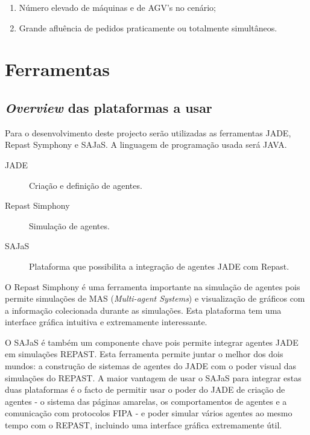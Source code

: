 \begin{titlepage}
\begin{enumerate}
\item Número elevado de máquinas e de AGV's no cenário;
\item Grande afluência de pedidos praticamente ou totalmente simultâneos.
\end{enumerate}



\section{Ferramentas}

\subsection{\textit{Overview} das plataformas a usar}
Para o desenvolvimento deste projecto serão utilizadas as ferramentas JADE, Repast Symphony e SAJaS. A linguagem de programação usada será JAVA.

\begin{description}
\item[JADE] Criação e definição de agentes.
\item[Repast Simphony] Simulação de agentes.
\item[SAJaS] Plataforma que possibilita a integração de agentes JADE com Repast.
\end{description}

O Repast Simphony é uma ferramenta importante na simulação de agentes pois permite simulações de MAS (\textit{Multi-agent Systems}) e visualização de gráficos com a informação colecionada durante as simulações. Esta plataforma tem uma interface gráfica intuitiva e extremamente interessante.

O SAJaS é também um componente chave pois permite integrar agentes JADE em simulações REPAST. Esta ferramenta permite juntar o melhor dos dois mundos: a construção de sistemas de agentes do JADE com o poder visual das simulações do REPAST. A maior vantagem de usar o SAJaS para integrar estas duas plataformas é o facto de permitir usar o poder do JADE de criação de agentes - o sistema das páginas amarelas, os comportamentos de agentes e a comunicação com protocolos FIPA - e poder simular vários agentes ao mesmo tempo com o REPAST, incluindo uma interface gráfica extremamente útil.


\end{titlepage}

